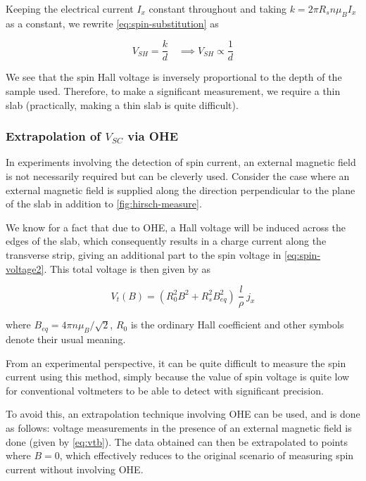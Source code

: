 Keeping the electrical current \( I_x \) constant throughout and taking \( k = 2 \pi R_s n \mu_B I_x \) as a constant, we rewrite \cref{eq:spin-substitution} as

\begin{equation}
    V_{SH} = \frac{k}{d} \quad \implies \boxed{V_{SH} \propto \frac{1}{d}}
\end{equation}

We see that the spin Hall voltage is inversely proportional to the depth of the sample used.
Therefore, to make a significant measurement, we require a thin slab (practically, making a thin slab is quite difficult).

\subsubsection{Extrapolation of \( V_{SC} \) via OHE}

\label{subsubsec:extrapolation}

In experiments involving the detection of spin current, an external magnetic field is not necessarily required but can be cleverly used.
Consider the case where an external magnetic field is supplied along the direction perpendicular to the plane of the slab in addition to \cref{fig:hirsch-measure}.

We know for a fact that due to OHE, a Hall voltage will be induced across the edges of the slab, which consequently results in a charge current along the transverse strip, giving an additional part to the spin voltage in \cref{eq:spin-voltage2}.
This total voltage is then given by \cite{hirsch1999spin} as

\begin{equation} \label{eq:vtb}
    V_t (B) = (R_0^2 B^2 + R_s^2 B_{eq}^2) \: \frac{l}{\rho} \: j_x
\end{equation}

where \( B_{eq} = 4 \pi n \mu_B / \sqrt{2} \), \( R_0 \) is the ordinary Hall coefficient and other symbols denote their usual meaning.

From an experimental perspective, it can be quite difficult to measure the spin current using this method, simply because the value of spin voltage is quite low for conventional voltmeters to be able to detect with significant precision.

To avoid this, an extrapolation technique involving OHE can be used, and is done as follows:
voltage measurements in the presence of an external magnetic field is done (given by \cref{eq:vtb}).
The data obtained can then be extrapolated to points where \( B = 0 \), which effectively reduces to the original scenario of measuring spin current without involving OHE.


